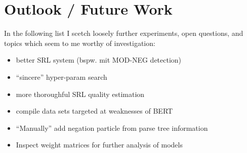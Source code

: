 \section{Outlook / Future Work}

In the following list I scetch loosely further experiments, open questions, and topics which
seem to me worthy of investigation:

\begin{itemize}
  \item better SRL system (bspw. mit MOD-NEG detection)
  \item ``sincere'' hyper-param search
  \item more thoroughful SRL quality estimation
  \item compile data sets targeted at weaknesses of BERT
  \item ``Manually'' add negation particle from parse tree information
  \item Inspect weight matrices for further analysis of models
\end{itemize}



